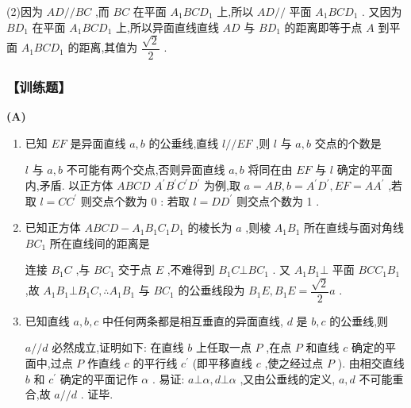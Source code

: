 (2)因为 ${AD}//{BC}$ ,而 ${BC}$ 在平面 ${A}_{1}{BC}{D}_{1}$ 上,所以 ${AD}//$ 平面 ${A}_{1}{BC}{D}_{1}$ . 又因为 $B{D}_{1}$ 在平面 ${A}_{1}{BC}{D}_{1}$ 上,所以异面直线直线 ${AD}$ 与 $B{D}_{1}$ 的距离即等于点 $A$ 到平面 ${A}_{1}{BC}{D}_{1}$ 的距离,其值为 $\dfrac{\sqrt{2}}{2}$ .

\subsubsection*{【训练题】}

\begin{center}  \textbf{(A)} \end{center}
\begin{enumerate}
    \item 已知 ${EF}$ 是异面直线 $a,b$ 的公垂线,直线 $l//{EF}$ ,则 $l$ 与 $a,b$ 交点的个数是 
    \begin{jieda}
        $l$ 与 $a,b$ 不可能有两个交点,否则异面直线 $a,b$ 将同在由 ${EF}$ 与 $l$ 确定的平面内,矛盾. 以正方体 ${ABCD}$  ${A}^{\prime }{B}^{\prime }{C}^{\prime }{D}^{\prime }$ 为例,取 $a = {AB},b = {A}^{\prime }{D}^{\prime },{EF} = A{A}^{\prime }$ ,若取 $l = C{C}^{\prime }$ 则交点个数为 0 : 若取 $l = D{D}^{\prime }$ 则交点个数为 1 .
    \end{jieda}
    \item 已知正方体 ${ABCD} - {A}_{1}{B}_{1}{C}_{1}{D}_{1}$ 的棱长为 $a$ ,则棱 ${A}_{1}{B}_{1}$ 所在直线与面对角线 $B{C}_{1}$ 所在直线间的距离是
    \begin{jieda}
        连接 ${B}_{1}C$ ,与 $B{C}_{1}$ 交于点 $E$ ,不难得到 ${B}_{1}C \bot  B{C}_{1}$ . 又 ${A}_{1}{B}_{1} \bot$ 平面 ${BC}{C}_{1}{B}_{1}$ ,故 ${A}_{1}{B}_{1} \bot  {B}_{1}C,\therefore {A}_{1}{B}_{1}$ 与 $B{C}_{1}$ 的公垂线段为 ${B}_{1}E,{B}_{1}E = \dfrac{\sqrt{2}}{2}a$ .
    \end{jieda}
    \item 已知直线 $a,b,c$ 中任何两条都是相互垂直的异面直线, $d$ 是 $b,c$ 的公垂线,则
    \begin{jieda}
        $a//d$ 必然成立,证明如下: 在直线 $b$ 上任取一点 $P$ ,在点 $P$ 和直线 $c$ 确定的平面中,过点 $P$ 作直线 $c$ 的平行线 ${c}^{\prime }$ (即平移直线 $c$ ,使之经过点 $P$ ). 由相交直线 $b$ 和 ${c}^{\prime }$ 确定的平面记作 $\alpha$ . 易证: $a\bot \alpha ,d\bot \alpha$ ,又由公垂线的定义, $a,d$ 不可能重合,故 $a//d$ . 证毕. 
        

\end{jieda}
\end{enumerate}
